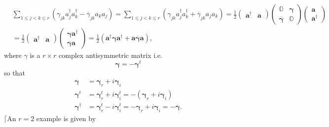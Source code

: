 \documentclass[aps, preprint]{revtex4}
\begin{document}
\begin{align} & \sum _{1 \leq j <k \leq r}\left (\gamma _{j k} a_{j}^{ \dag } a_{k}^{ \dag } -\overline{\gamma }_{j k} a_{k} a_{j}\right ) =\sum _{1 \leq j <k \leq r}\left (\gamma _{j k} a_{j}^{ \dag } a_{k}^{ \dag } +\overline{\gamma }_{j k} a_{j} a_{k}\right ) =\frac{1}{2} \left (\begin{array}{cc}\mathbf{a}^{ \dag } & \mathbf{a}\end{array}\right ) \left (\begin{array}{cc}\mathbb{O} & \mathbf{\gamma } \\
\overline{\mathbf{\gamma }} & \mathbb{O}\end{array}\right ) \left (\begin{array}{c}\mathbf{a} \\
\mathbf{a}^{ \dag }\end{array}\right ) \\
 &  =\frac{1}{2} \left (\begin{array}{cc}\mathbf{a}^{ \dag } & \mathbf{a}\end{array}\right ) \left (\begin{array}{c}\mathbf{\gamma } \mathbf{a}^{ \dag } \\
\overline{\mathbf{\gamma }} \mathbf{a}\end{array}\right ) =\frac{1}{2} \left (\mathbf{a}^{ \dag } \mathbf{\gamma } \mathbf{a}^{ \dag } +\mathbf{a} \overline{\mathbf{\gamma }} \mathbf{a}\right )\text{,}\end{align}where $\gamma $ is a $r \times r$ complex antisymmetric matrix i.e.
\begin{equation}\mathbf{\gamma }  = -\mathbf{\gamma }^{t}
\end{equation}so that
\begin{align}\mathbf{\gamma } &  =\mathbf{\gamma }_{r} +i \mathbf{\gamma }_{i} \\
\mathbf{\gamma }^{t} &  =\mathbf{\gamma }_{r}^{t} +i \mathbf{\gamma }_{i}^{t} = -\left (\mathbf{\gamma }_{r} +i \mathbf{\gamma }_{i}\right ) \\
\mathbf{\gamma }^{ \dag } &  =\mathbf{\gamma }_{r}^{t} -i \mathbf{\gamma }_{i}^{t} = -\mathbf{\gamma }_{r} +i \mathbf{\gamma }_{i} = -\overline{\mathbf{\gamma }}\text{.}\end{align}$\lceil $An $r =2$ example is given by
\end{document}

